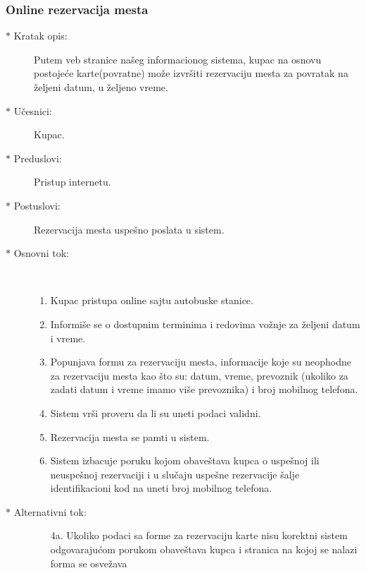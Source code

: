 \subsubsection{Online rezervacija mesta}
\begin{description}
	\item [$\ast$ Kratak opis: ] Putem veb stranice na\v seg informacionog sistema, kupac na osnovu postoje\' ce karte(povratne) mo\v ze izvr\v siti rezervaciju mesta za povratak na \v zeljeni datum, u \v zeljeno vreme.
	\item[$\ast$ U\v cesnici: ] Kupac.
	\item[$\ast$ Preduslovi: ] Pristup internetu.
	\item[$\ast$ Postuslovi: ] Rezervacija mesta uspe\v sno poslata u sistem.
	\item[$\ast$ Osnovni tok: ] \ \\
	\renewcommand{\labelenumii}{\Roman{enumii}}
	\begin{enumerate}
		\item Kupac pristupa online sajtu autobuske stanice.
		\item Informi\v se se o dostupnim terminima i redovima vo\v znje za \v zeljeni datum i vreme.
		\item Popunjava formu za rezervaciju mesta, informacije koje su neophodne za rezervaciju mesta kao \v sto su: datum, vreme, prevoznik (ukoliko za zadati datum i vreme imamo vi\v se prevoznika) i broj mobilnog telefona.
		\item Sistem vr\v si proveru da li su uneti podaci validni.
		\item Rezervacija mesta se pamti u sistem.
		\item Sistem izbacuje poruku kojom obave\v stava kupca o uspe\v snoj ili neuspe\v snoj rezervaciji i u slu\v caju uspe\v sne rezervacije \v salje identifikacioni kod na uneti broj mobilnog telefona.
	\end{enumerate}
	\item[$\ast$ Alternativni tok: ]
	\begin{enumerate}
	\item[4a. ] Ukoliko podaci sa forme za rezervaciju karte nisu korektni sistem odgovaraju\' com porukom obave\v stava kupca i stranica na kojoj se nalazi forma se osve\v zava
	\end{enumerate}
\begin{figure}[h!tb] 
	\centering

\end{figure}
\end{description}
